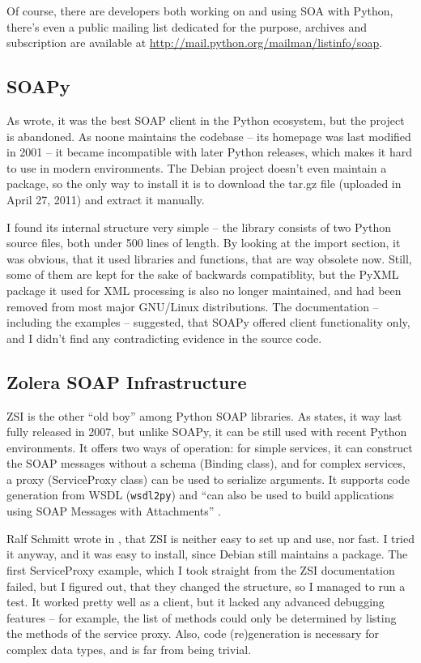 Of course, there are developers both working on and using SOA with Python, there's even a public mailing list dedicated for the purpose, archives and subscription are available at \url{http://mail.python.org/mailman/listinfo/soap}.

\subsection{SOAPy}

As \cite{so-206154} wrote, it was the best SOAP client in the Python ecosystem, but the project is abandoned. As noone maintains the codebase -- its homepage was last modified in 2001 -- it became incompatible with later Python releases, which makes it hard to use in modern environments. The Debian project doesn't even maintain a package, so the only way to install it is to download the tar.gz file (uploaded in April 27, 2011) and extract it manually.

I found its internal structure very simple -- the library consists of two Python source files, both under 500 lines of length. By looking at the import section, it was obvious, that it used libraries and functions, that are way obsolete now. Still, some of them are kept for the sake of backwards compatiblity, but the PyXML package it used for XML processing is also no longer maintained, and had been removed from most major GNU/Linux distributions. The documentation -- including the examples -- suggested, that SOAPy offered client functionality only, and I didn't find any contradicting evidence in the source code.

\subsection{Zolera SOAP Infrastructure}

ZSI is the other ``old boy'' among Python SOAP libraries. As \cite{pywebsvcs-talk} states, it way last fully released in 2007, but unlike SOAPy, it can be still used with recent Python environments. It offers two ways of operation: for simple services, it can construct the SOAP messages without a schema (Binding class), and for complex services, a proxy (ServiceProxy class) can be used to serialize arguments. It supports code generation from WSDL (\verb|wsdl2py|) and ``can also be used to build applications using SOAP Messages with Attachments'' \cite{zsi-doc}.

Ralf Schmitt wrote in \cite{zsi-velocity}, that ZSI is neither easy to set up and use, nor fast. I tried it anyway, and it was easy to install, since Debian still maintains a package. The first ServiceProxy example, which I took straight from the ZSI documentation failed, but I figured out, that they changed the structure, so I managed to run a test. It worked pretty well as a client, but it lacked any advanced debugging features -- for example, the list of methods could only be determined by listing the methods of the service proxy. Also, code (re)generation is necessary for complex data types, and is far from being trivial.

